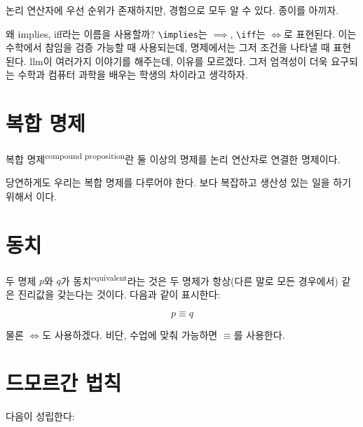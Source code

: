 \documentclass[../note.tex]{subfiles}
\begin{document}
논리 연산자에 우선 순위가 존재하지만, 경험으로 모두 알 수 있다. 종이를 아끼자.

\begin{note}
  왜 implies, iff라는 이름을 사용할까?  \verb|\implies|는 $\implies$, \verb|\iff|는 $\iff$로 표현된다. 이는 수학에서 참임을 검증 가능할 때 사용되는데, 명제에서는 그저 조건을 나타낼 때 표현된다. llm이 여러가지 이야기를 해주는데, 이유를 모르겠다. 그저 엄격성이 더욱 요구되는 수학과 컴퓨터 과학을 배우는 학생의 차이라고 생각하자.
\end{note}

\section{복합 명제}
\begin{definition}[복합 명제]
  복합 명제\textsuperscript{compound proposition}란 둘 이상의 명제를 논리 연산자로 연결한 명제이다.
\end{definition}
당연하게도 우리는 복합 명제를 다루어야 한다. 보다 복잡하고 생산성 있는 일을 하기 위해서 이다.

\section{동치}
\begin{definition}[동치]
  두 명제 $p$와 $q$가 동치\textsuperscript{equivalent}라는 것은 두 명제가 항상(다른 말로 모든 경우에서) 같은 진리값을 갖는다는 것이다. 다음과 같이 표시한다:

  \begin{equation}
    p \equiv q
  \end{equation}
\end{definition}
물론 $\iff$도 사용하겠다. 비단, 수업에 맞춰 가능하면 $\equiv$를 사용한다.

\section{드모르간 법칙}
\begin{definition}[드로모르간 법칙]
  다음이 성립한다:
  \begin{align}

  \end{align}
\end{definition}
\end{document}
